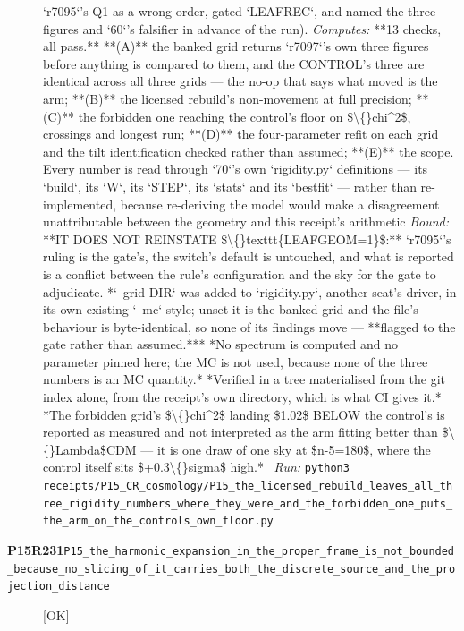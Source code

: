 \begin{description}
`r7095`'s Q1 as a wrong order, gated `LEAFREC`, and named the three figures and `60`'s falsifier in advance of the run). 
\emph{Computes:} **13 checks, all pass.** **(A)** the banked grid returns `r7097`'s own three figures before anything is compared to them, and the CONTROL's three are identical across all three grids --- the no-op that says what moved is the arm; **(B)** the licensed rebuild's non-movement at full precision; **(C)** the forbidden one reaching the control's floor on \$\textbackslash\{\}chi\textasciicircum{}2\$, crossings and longest run; **(D)** the four-parameter refit on each grid and the tilt identification checked rather than assumed; **(E)** the scope. Every number is read through `70`'s own `rigidity.py` definitions --- its `build`, its `W`, its `STEP`, its `stats` and its `bestfit` --- rather than re-implemented, because re-deriving the model would make a disagreement unattributable between the geometry and this receipt's arithmetic
 \emph{Bound:}  **IT DOES NOT REINSTATE \$\textbackslash\{\}texttt\{LEAFGEOM=1\}\$:** `r7095`'s ruling is the gate's, the switch's default is untouched, and what is reported is a conflict between the rule's configuration and the sky for the gate to adjudicate.  *`--grid DIR` was added to `rigidity.py`, another seat's driver, in its own existing `--mc` style; unset it is the banked grid and the file's behaviour is byte-identical, so none of its findings move --- **flagged to the gate rather than assumed.***  *No spectrum is computed and no parameter pinned here; the MC is not used, because none of the three numbers is an MC quantity.*  *Verified in a tree materialised from the git index alone, from the receipt's own directory, which is what CI gives it.*  *The forbidden grid's \$\textbackslash\{\}chi\textasciicircum{}2\$ landing \$1.02\$ BELOW the control's is reported as measured and not interpreted as the arm fitting better than \$\textbackslash\{\}Lambda\$CDM --- it is one draw of one sky at \$n-5=180\$, where the control itself sits \$+0.3\textbackslash\{\}sigma\$ high.*
\ \emph{Run:} \texttt{python3 receipts/P15\_CR\_cosmology/P15\_the\_licensed\_rebuild\_leaves\_all\_three\_rigidity\_numbers\_where\_they\_were\_and\_the\_forbidden\_one\_puts\_the\_arm\_on\_the\_controls\_own\_floor.py}
\item[\rcptlabel{P15_the_harmonic_expansion_in_the_proper_frame_is_not_bounded_because_no_slicing_of_it_carries_both_the_discrete_source_and_the_projection_distance}{P15R231}\textbf{P15R231}\quad\texttt{P15\_the\_harmonic\_expansion\_in\_the\_proper\_frame\_is\_not\_bounded\_because\_no\_slicing\_of\_it\_carries\_both\_the\_discrete\_source\_and\_the\_projection\_distance}]\hfill\textsf{[OK]}\\

\end{description}
